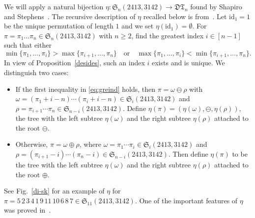 \documentclass[12pt]{amsart}
\numberwithin{equation}{section}
\theoremstyle{plain}
\theoremstyle{definition}
\def\S{\mathfrak{S}}
\newcommand{\id}{\mathrm{id}}
\def\id{\mathrm{id}}
\newcommand{\DT}{\mathfrak{DT}}
\begin{document}
We will apply a natural  bijection $\eta:\S_n(2413,3142)\rightarrow \DT_n$ found by Shapiro and Stephens~\cite{shapi}. The recursive description of $\eta$ recalled below is from~\cite{flz}. Let $\id_1=1$ be the unique permutation of length $1$ and we set $\eta(\id_1)=\emptyset$. For $\pi=\pi_1\ldots\pi_n\in\S_n(2413,3142)$ with $n\geq2$,  find the greatest index $i\in[n-1]$ such that either 
 \begin{equation}\label{eq:greind}
 \min\{\pi_1,\ldots,\pi_i\}>\max\{\pi_{i+1},\ldots,\pi_n\}\quad\text{or}\quad\max\{\pi_1,\ldots,\pi_i\}<\min\{\pi_{i+1},\ldots,\pi_n\}.
 \end{equation}
 In view of Proposition~\ref{desides}, such an index $i$ exists and is unique. We distinguish two cases:
 \begin{itemize}
 \item If the first inequality in \eqref{eq:greind} holds, then $\pi=\omega\ominus\rho$ with $\omega=(\pi_1+i-n)\cdots(\pi_i+i-n)\in\S_i(2413,3142)$ and $\rho=\pi_{i+1}\cdots\pi_{n}\in\S_{n-i}(2413,3142)$. Define $\eta(\pi)=(\eta(\omega),\ominus,\eta(\rho))$, the tree with the left subtree $\eta(\omega)$ and the right subtree $\eta(\rho)$ attached to the root $\ominus$. 
 \item Otherwise,  $\pi=\omega\oplus\rho$, where $\omega=\pi_1\cdots\pi_i\in\S_i(2413,3142)$ and $\rho=(\pi_{i+1}-i)\cdots(\pi_{n}-i)\in\S_{n-i}(2413,3142)$. Then define $\eta(\pi)$ to be the tree with the left subtree $\eta(\omega)$ and the right subtree $\eta(\rho)$ attached to the root $\oplus$.
\end{itemize}
See Fig.~\ref{di-sk} for an example of $\eta$ for $\pi=5\,2\,3\,4\,1\,9\,11\,10\,6\,8\,7\in\S_{11}(2413,3142)$. One of the important features of $\eta$ was proved in~\cite{flz}.
\end{document}
